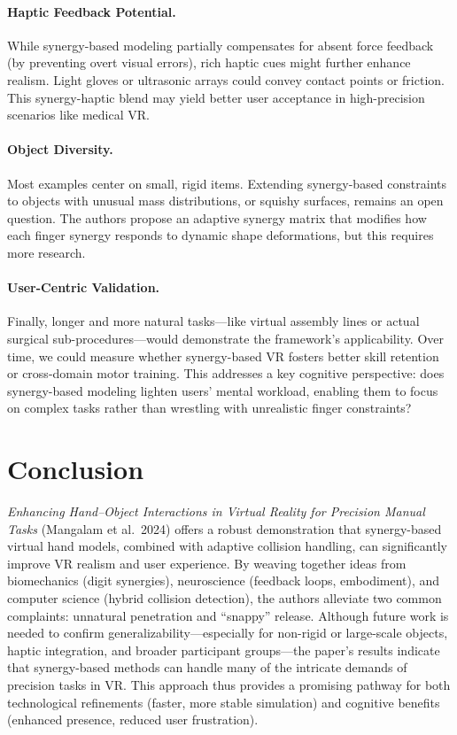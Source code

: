 \documentclass[11pt]{llncs}
\begin{document}
\paragraph{Haptic Feedback Potential.}
While synergy-based modeling partially compensates for absent force feedback (by preventing overt visual errors), rich haptic cues might further enhance realism. Light gloves or ultrasonic arrays could convey contact points or friction. This synergy-haptic blend may yield better user acceptance in high-precision scenarios like medical VR.

\paragraph{Object Diversity.}
Most examples center on small, rigid items. Extending synergy-based constraints to objects with unusual mass distributions, or squishy surfaces, remains an open question. The authors propose an adaptive synergy matrix that modifies how each finger synergy responds to dynamic shape deformations, but this requires more research.

\paragraph{User-Centric Validation.}
Finally, longer and more natural tasks---like virtual assembly lines or actual surgical sub-procedures---would demonstrate the framework's applicability. Over time, we could measure whether synergy-based VR fosters better skill retention or cross-domain motor training. This addresses a key cognitive perspective: does synergy-based modeling lighten users' mental workload, enabling them to focus on complex tasks rather than wrestling with unrealistic finger constraints?

\section*{Conclusion}
\emph{Enhancing Hand--Object Interactions in Virtual Reality for Precision Manual Tasks} (Mangalam et al.\ 2024) offers a robust demonstration that synergy-based virtual hand models, combined with adaptive collision handling, can significantly improve VR realism and user experience. By weaving together ideas from biomechanics (digit synergies), neuroscience (feedback loops, embodiment), and computer science (hybrid collision detection), the authors alleviate two common complaints: unnatural penetration and ``snappy'' release. Although future work is needed to confirm generalizability---especially for non-rigid or large-scale objects, haptic integration, and broader participant groups---the paper’s results indicate that synergy-based methods can handle many of the intricate demands of precision tasks in VR. This approach thus provides a promising pathway for both technological refinements (faster, more stable simulation) and cognitive benefits (enhanced presence, reduced user frustration).
\end{document}
